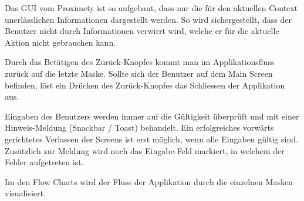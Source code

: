 Das GUI vom Proximety ist so aufgebaut, dass nur die für den aktuellen Context unerlässlichen Informationen dargestellt werden. So wird sichergestellt, dass der Benutzer nicht durch Informationen verwirrt wird, welche er für die aktuelle Aktion nicht gebrauchen kann.

Durch das Betätigen des Zurück-Knopfes kommt man im Applikationsfluss zurück auf die letzte Maske. Sollte sich der Benutzer auf dem Main Screen befinden, löst ein Drücken des Zurück-Knopfes das Schliessen der Applikation aus. 

Eingaben des Benutzers werden immer auf die Gültigkeit überprüft und mit einer Hinweis-Meldung (Snackbar / Toast) behandelt. Ein erfolgreiches vorwärts gerichtetes Verlassen der Screens ist erst möglich, wenn alle Eingaben gültig sind. Zusätzlich zur Meldung wird noch das Eingabe-Feld markiert, in welchem der Fehler aufgetreten ist.

Im den Flow Charts wird der Fluss der Applikation durch die einzelnen Masken visualisiert.